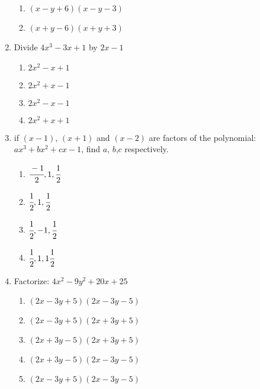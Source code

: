 \begin{multicols}{2}
\begin{enumerate}[label={\arabic*.}]
\begin{enumerate}[label={\Alph*.}]
	\item \((x-y+6)(x-y-3)\)
	\item \((x+y-6)(x+y+3)\)
	\end{enumerate}
\item Divide $4x^3 - 3x + 1$ by $2x -1$
	\begin{enumerate}[label={\Alph*.}]
	\item \(2x^2 -x + 1\)
	\item \(2x^2 + x -1\)
	\item \(2x^2-x-1\)
	\item \(2x^2 +x + 1\)
	\end{enumerate}
\item if $(x-1)$, $(x+1)$ and $(x-2)$ are factors of the polynomial: $ax^3 + bx^2 +cx -1$, find $a$, $b$,$c$ respectively. 
	\begin{enumerate}[label={\Alph*.}]
	\item \(\cfrac{-1}{2},1, \cfrac{1}{2}\)
	\item \(\cfrac{1}{2}, 1, \cfrac{1}{2}\)
	\item \(\cfrac{1}{2}, -1, \cfrac{1}{2}\)
	\item \(\cfrac{1}{2}, 1, 1\cfrac{1}{2}\)
	\end{enumerate}
\item Factorize: $4x^2 - 9y^2 + 20x + 25 $
	\begin{enumerate}[label={\Alph*.}]
	\item \((2x -3y + 5)(2x - 3y -5)\)
	\item \((2x - 3y + 5)(2x + 3y + 5)\)
	\item \((2x + 3y - 5)(2x + 3y + 5)\)
	\item \((2x + 3y - 5 )(2x - 3y -5)\)
	\item \((2x - 3y + 5 )(2x - 3y -5)\)


\end{enumerate}
\end{enumerate}
\end{multicols}
